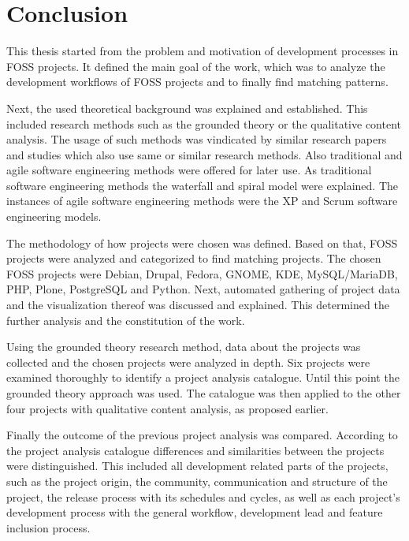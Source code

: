 \chapter{Conclusion} %
\label{chap:conclusion}

This thesis started from the problem and motivation of development processes in
\ac{FOSS} projects. It defined the main goal of the work, which was to analyze
the development workflows of \ac{FOSS} projects and to finally find matching
patterns.

Next, the used theoretical background was explained and established. This
included research methods such as the grounded theory or the qualitative
content analysis. The usage of such methods was vindicated by similar research
papers and studies which also use same or similar research methods. Also
traditional and agile software engineering methods were offered for later use.
As traditional software engineering methods the waterfall and spiral model were
explained. The instances of agile software engineering methods were the
\acl{XP} and Scrum software engineering models.

The methodology of how projects were chosen was defined. Based on that,
\ac{FOSS} projects were analyzed and categorized to find matching projects.
The chosen \ac{FOSS} projects were Debian, Drupal, Fedora, GNOME, KDE,
MySQL/MariaDB, PHP, Plone, PostgreSQL and Python. Next, automated gathering of
project data and the visualization thereof was discussed and explained. This
determined the further analysis and the constitution of the work.

Using the grounded theory research method, data about the projects was
collected and the chosen projects were analyzed in depth. Six projects were
examined thoroughly to identify a project analysis catalogue. Until this point
the grounded theory approach was used. The catalogue was then applied to the
other four projects with qualitative content analysis, as proposed earlier.

Finally the outcome of the previous project analysis was compared. According to
the project analysis catalogue differences and similarities between the
projects were distinguished. This included all development related parts of the
projects, such as the project origin, the community, communication and
structure of the project, the release process with its schedules and cycles, as
well as each project's development process with the general workflow,
development lead and feature inclusion process.

